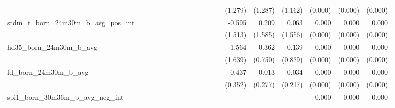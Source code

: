 \begin{tabular}{lrrrrrrrrrrrrrrrrrr}
                                            &              &              &              &              &              &              &              &              &               &              &              &               &      (1.279) &      (1.287) &       (1.162) &      (0.000) &      (0.000) &       (0.000) \\ 
stdm\_t\_born\_24m30m\_b\_avg\_pos\_int     &              &              &              &              &              &              &              &              &               &              &              &               &       -0.595 &        0.209 &         0.063 &        0.000 &        0.000 &         0.000 \\ 
                                            &              &              &              &              &              &              &              &              &               &              &              &               &      (1.513) &      (1.585) &       (1.556) &      (0.000) &      (0.000) &       (0.000) \\ 
hd35\_born\_24m30m\_b\_avg                  &              &              &              &              &              &              &              &              &               &              &              &               &        1.564 &        0.362 &        -0.139 &        0.000 &        0.000 &         0.000 \\ 
                                            &              &              &              &              &              &              &              &              &               &              &              &               &      (1.639) &      (0.750) &       (0.839) &      (0.000) &      (0.000) &       (0.000) \\ 
fd\_born\_24m30m\_b\_avg                    &              &              &              &              &              &              &              &              &               &              &              &               &       -0.437 &       -0.013 &         0.034 &        0.000 &        0.000 &         0.000 \\ 
                                            &              &              &              &              &              &              &              &              &               &              &              &               &      (0.352) &      (0.277) &       (0.217) &      (0.000) &      (0.000) &       (0.000) \\ 
spi1\_born\_30m36m\_b\_avg\_neg\_int        &              &              &              &              &              &              &              &              &               &              &              &               &              &              &               &        0.000 &        0.000 &         0.000 \\ 

\end{tabular}
